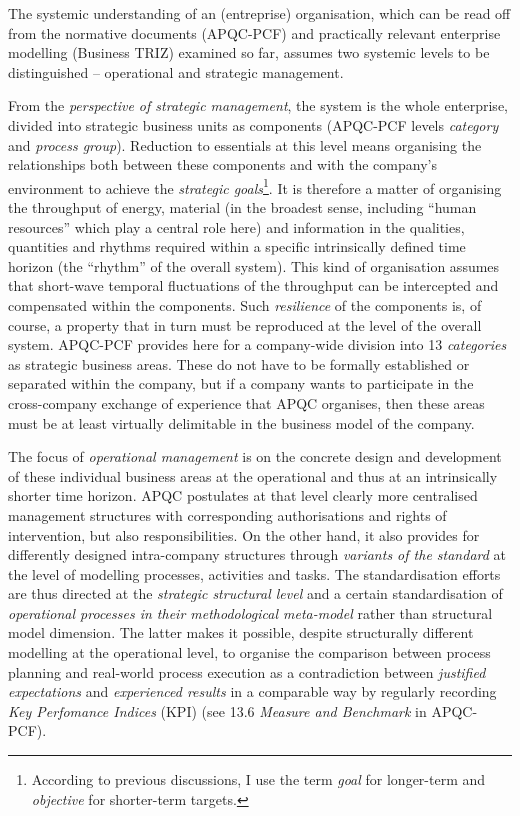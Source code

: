 \documentclass[11pt,a4paper]{article}
\begin{document}
The systemic understanding of an (entreprise) organisation, which can be read
off from the normative documents (APQC-PCF) and practically relevant
enterprise modelling (Business TRIZ) examined so far, assumes two systemic
levels to be distinguished -- operational and strategic management.

From the \emph{perspective of strategic management}, the system is the whole
enterprise, divided into strategic business units as components (APQC-PCF
levels \emph{category} and \emph{process group}). Reduction to essentials at
this level means organising the relationships both between these components
and with the company's environment to achieve the \emph{strategic
  goals}\footnote{According to previous discussions, I use the term
  \emph{goal} for longer-term and \emph{objective} for shorter-term targets.}.
It is therefore a matter of organising the throughput of energy, material (in
the broadest sense, including \enquote{human resources} which play a central
role here) and information in the qualities, quantities and rhythms required
within a specific intrinsically defined time horizon (the \enquote{rhythm} of
the overall system). This kind of organisation assumes that short-wave
temporal fluctuations of the throughput can be intercepted and compensated
within the components. Such \emph{resilience} of the components is, of course,
a property that in turn must be reproduced at the level of the overall system.
APQC-PCF provides here for a company-wide division into 13 \emph{categories}
as strategic business areas. These do not have to be formally established or
separated within the company, but if a company wants to participate in the
cross-company exchange of experience that APQC organises, then these areas
must be at least virtually delimitable in the business model of the company.

The focus of \emph{operational management} is on the concrete design and
development of these individual business areas at the operational and thus at
an intrinsically shorter time horizon.  APQC postulates at that level clearly
more centralised management structures with corresponding authorisations and
rights of intervention, but also responsibilities. On the other hand, it also
provides for differently designed intra-company structures through
\emph{variants of the standard} at the level of modelling processes,
activities and tasks. The standardisation efforts are thus directed at the
\emph{strategic structural level} and a certain standardisation of
\emph{operational processes in their methodological meta-model} rather than
structural model dimension. The latter makes it possible, despite structurally
different modelling at the operational level, to organise the comparison
between process planning and real-world process execution as a contradiction
between \emph{justified expectations} and \emph{experienced results} in a
comparable way by regularly recording \emph{Key Perfomance Indices} (KPI) (see
13.6 \emph{Measure and Benchmark} in APQC-PCF).
\end{document}
